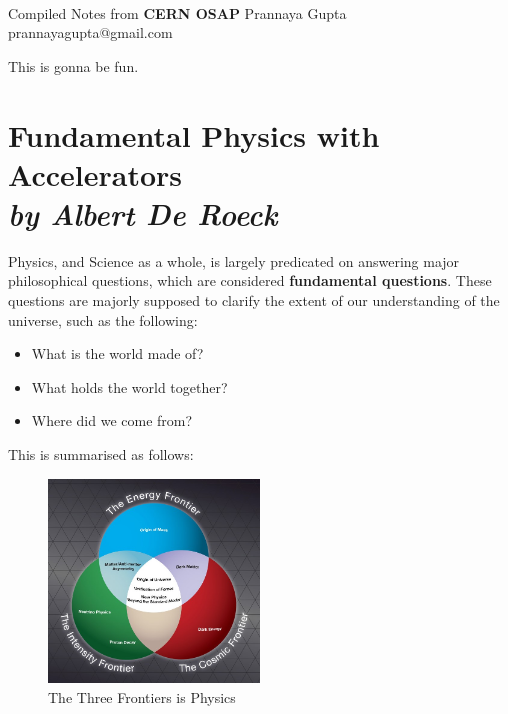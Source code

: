 \documentclass[11pt]{article}
\begin{document}
\thispagestyle{empty}
\bigskip \
\vspace{0.1cm}

\begin{center}
{\fontsize{22}{22} \selectfont Compiled Notes from}
\vskip 16pt
{\fontsize{36}{36} \selectfont \bf \sffamily CERN OSAP}
\vskip 24pt
{\fontsize{18}{18} \selectfont \rmfamily Prannaya Gupta} 
\vskip 6pt
{\fontsize{14}{14} \selectfont \ttfamily prannayagupta@gmail.com} 
\vskip 24pt
\end{center}

{\parindent0pt \baselineskip=15.5pt This is gonna be fun.}

\newpage
\microtoc
\newpage

\section{Fundamental Physics with Accelerators \\
\large{\it{by Albert De Roeck}}}

Physics, and Science as a whole, is largely predicated on answering major philosophical questions, which are considered \textbf{fundamental questions}. These questions are majorly supposed to clarify the extent of our understanding of the universe, such as the following:
\begin{itemize}
    \item What is the world made of?
    \item What holds the world together?
    \item Where did we come from?
\end{itemize}

This is summarised as follows:

\begin{figure}[h]
    \centering
    \includegraphics[width=0.5\textwidth]{images/three-frontiers.jpg}
    \caption{The Three Frontiers is Physics}
    \label{fig:frontiers}
\end{figure}
\end{document}

